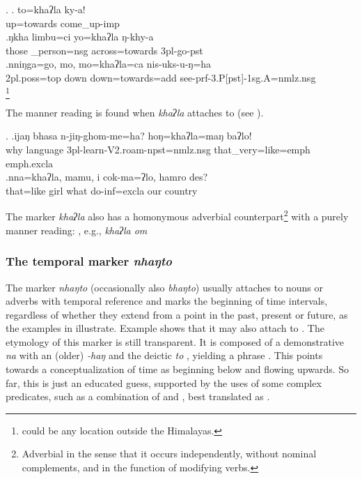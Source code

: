 \ex. \ag. to=khaʔla ky-a!\\
up=towards come\_up{\sc -imp}\\
\bg.ŋkha limbu=ci             yo=khaʔla  ŋ-khy-a\\
those \_person{\sc =nsg} across=towards {\sc 3pl-}go{\sc -pst}\\
 
\bg.nniŋga=go,          mo,  mo=khaʔla=ca        nis-uks-u-ŋ=ha\\
{\sc 2pl.poss=top} down down=towards{\sc =add} see{\sc -prf-3.P[pst]-1sg.A=nmlz.nsg}\\
\footnote{ could be any location outside the Himalayas.}

The manner reading is found when \emph{khaʔla}  attaches to  (see \Next).

\ex. \ag.ijaŋ bhasa    n-jiŋ-ghom-me=ha?                        hoŋ=khaʔla=maŋ baʔlo!\\
why language {\sc 3pl-}learn{\sc -V2.roam-npst=nmlz.nsg} that\_very=like{\sc =emph} {\sc emph.excla}\\
 
\bg.nna=khaʔla, mamu, i    cok-ma=ʔlo,               hamro des?\\
that=like girl what do{\sc -inf=excla} our country\\
 

The marker \emph{khaʔla} also has a homonymous adverbial counterpart\footnote{Adverbial in the sense that it occurs independently, without nominal complements, and in the function of  modifying verbs.} with a purely manner reading: , e.g.,  \emph{khaʔla om}  

\subsubsection{The temporal  marker \emph{nhaŋto} }
   
   The marker \emph{nhaŋto} (occasionally also \emph{bhaŋto}) usually attaches to nouns or adverbs with temporal reference and marks the beginning of time intervals, regardless of whether they extend from a point in the past, present or future, as the examples in \Next illustrate. Example \Next[d] shows that it may also attach to  . The etymology of this marker is still transparent. It is composed of a demonstrative \emph{na} with an (older)  \emph{-haŋ} and the deictic  \emph{to} , yielding a phrase . This points towards a conceptualization of time as beginning below and flowing upwards. So  far, this is just an educated guess, supported by the uses of some complex predicates, such as a combination of  and , best translated as .
 

